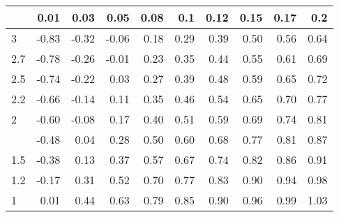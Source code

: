 
\begin{tabular}{lrrrrrrrrr}
\toprule
  & 0.01 & 0.03 & 0.05 & 0.08 & 0.1 & 0.12 & 0.15 & 0.17 & 0.2\\
\midrule
3 & -0.83 & -0.32 & -0.06 & 0.18 & 0.29 & 0.39 & 0.50 & 0.56 & 0.64\\
2.7 & -0.78 & -0.26 & -0.01 & 0.23 & 0.35 & 0.44 & 0.55 & 0.61 & 0.69\\
2.5 & -0.74 & -0.22 & 0.03 & 0.27 & 0.39 & 0.48 & 0.59 & 0.65 & 0.72\\
2.2 & -0.66 & -0.14 & 0.11 & 0.35 & 0.46 & 0.54 & 0.65 & 0.70 & 0.77\\
2 & -0.60 & -0.08 & 0.17 & 0.40 & 0.51 & 0.59 & 0.69 & 0.74 & 0.81\\
\addlinespace
1.7 & -0.48 & 0.04 & 0.28 & 0.50 & 0.60 & 0.68 & 0.77 & 0.81 & 0.87\\
1.5 & -0.38 & 0.13 & 0.37 & 0.57 & 0.67 & 0.74 & 0.82 & 0.86 & 0.91\\
1.2 & -0.17 & 0.31 & 0.52 & 0.70 & 0.77 & 0.83 & 0.90 & 0.94 & 0.98\\
1 & 0.01 & 0.44 & 0.63 & 0.79 & 0.85 & 0.90 & 0.96 & 0.99 & 1.03\\
\bottomrule
\end{tabular}
